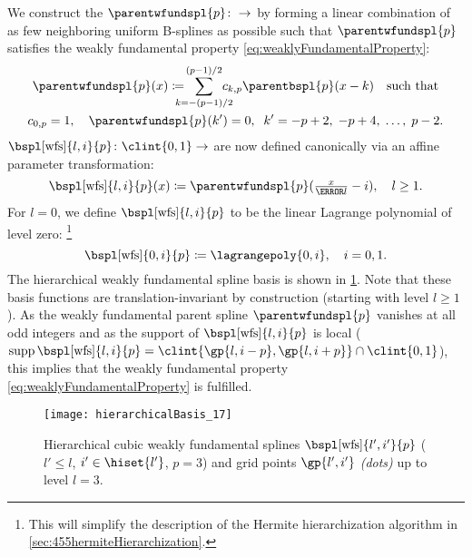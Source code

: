 We construct the 
$\parentwfundspl{p}\colon \real \to \real$
by forming a linear combination of as few neighboring
uniform B-splines as possible such that $\parentwfundspl{p}$
satisfies the weakly fundamental property
\eqref{eq:weaklyFundamentalProperty}:
\begin{subequations}
  \begin{gather}
    \label{eq:weaklyFundamentalSplineParent}
    \parentwfundspl{p}(x)
    \ceq \largesum[(p-1)/2]{k=-(p-1)/2}
    \wfundsplcoeff{k}{p} \parentbspl{p}(x - k)
    \quad\text{such that}\\
    \wfundsplcoeff{0}{p} = 1,\quad
    \parentwfundspl{p}(k') = 0,\;\;
    k' = -p + 2,\; -p + 4,\; \dotsc,\; p - 2.
  \end{gather}
\end{subequations}
$\bspl[\wfs]{l,i}{p}\colon \clint{0, 1} \to \real$
are now defined canonically via an affine parameter transformation:
\begin{equation}
  \bspl[\wfs]{l,i}{p}(x)
  \ceq \parentwfundspl{p}(\tfrac{x}{\ms{l}} - i),\quad
  l \ge 1.
\end{equation}
For $l = 0$, we define $\bspl[\wfs]{l,i}{p}$ to be the
linear Lagrange polynomial of level zero:%
\footnote{%
  This will simplify the description of the
  Hermite hierarchization algorithm in \cref{sec:455hermiteHierarchization}.%
}
\begin{equation}
  \bspl[\wfs]{0,i}{p}
  \ceq \lagrangepoly{0,i},\quad
  i = 0, 1.
\end{equation}
The hierarchical weakly fundamental spline basis is shown in
\cref{fig:hierarchicalWeaklyFundamentalSpline}.
Note that these basis functions are translation-invariant by construction
(starting with level $l \ge 1$).
As the weakly fundamental parent spline $\parentwfundspl{p}$
vanishes at all odd integers and as the
support of $\bspl[\wfs]{l,i}{p}$ is local
($\supp \bspl[\wfs]{l,i}{p}
= \clint{\gp{l,i-p}, \gp{l,i+p}} \cap \clint{0, 1}$),
this implies that the weakly fundamental property
\eqref{eq:weaklyFundamentalProperty} is fulfilled.

\begin{SCfigure}
  \texttt{[image: hierarchicalBasis\_17]}%
  \caption[%
    Hierarchical weakly fundamental splines%
  ]{%
    Hierarchical cubic weakly
    \vspace{-0.1em}%
    fundamental splines
    $\bspl[\wfs]{l',i'}{p}$
    ($l' \le l$, $i' \in \hiset{l'}$, $p = 3$) and
    grid points $\gp{l',i'}$ \emph{(dots)} up to level $l = 3$.%
  }%
  \label{fig:hierarchicalWeaklyFundamentalSpline}%
\end{SCfigure}

